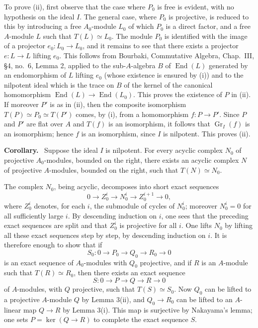 \documentclass[11pt]{article}
\newenvironment{statement}[1]{\par\medskip\noindent\textbf{#1.}\ }{\par\medskip}
\providecommand{\End}{\operatorname{End}}
\providecommand{\End}{\operatorname{End}}
\begin{document}
To prove (ii), first observe that the case where $P_0$ is free is evident, with no hypothesis on the ideal $I$. The general case, where $P_0$ is projective, is reduced to this by introducing a free $A_0$-module $L_0$ of which $P_0$ is a direct factor, and a free $A$-module $L$ such that $T(L)\simeq L_0$. The module $P_0$ is identified with the image of a projector $e_0:L_0\to L_0$, and it remains to see that there exists a projector $e:L\to L$ lifting $e_0$. This follows from Bourbaki, Commutative Algebra, Chap.~III, §4, no.~6, Lemma 2, applied to the sub-$A$-algebra $B$ of $\End(L)$ generated by an endomorphism of $L$ lifting $e_0$ (whose existence is ensured by (i)) and to the nilpotent ideal which is the trace on $B$ of the kernel of the canonical homomorphism $\End(L)\to\End(L_0)$. This proves the existence of $P$ in (ii). If moreover $P'$ is as in (ii), then the composite isomorphism $T(P)\simeq P_0\simeq T(P')$ comes, by (i), from a homomorphism $f:P\to P'$. Since $P$ and $P'$ are flat over $A$ and $T(f)$ is an isomorphism, it follows that $\operatorname{Gr}_I(f)$ is an isomorphism; hence $f$ is an isomorphism, since $I$ is nilpotent. This proves (ii).

\begin{statement}{Corollary}
Suppose the ideal $I$ is nilpotent. For every acyclic complex $N_0$ of projective $A_0$-modules, bounded on the right, there exists an acyclic complex $N$ of projective $A$-modules, bounded on the right, such that $T(N)\simeq N_0$.
\end{statement}

The complex $N_0$, being acyclic, decomposes into short exact sequences
\[
0\longrightarrow Z_0^i\longrightarrow N_0^i\longrightarrow Z_0^{i+1}\longrightarrow0,
\]
where $Z_0^i$ denotes, for each $i$, the submodule of cycles of $N_0^i$; moreover $N_0^i=0$ for all sufficiently large $i$. By descending induction on $i$, one sees that the preceding exact sequences are split and that $Z_0^i$ is projective for all $i$. One lifts $N_0$ by lifting all these exact sequences step by step, by descending induction on $i$. It is therefore enough to show that if
\[
S_0:0\longrightarrow P_0\longrightarrow Q_0\longrightarrow R_0\longrightarrow0
\]
is an exact sequence of $A_0$-modules with $Q_0$ projective, and if $R$ is an $A$-module such that $T(R)\simeq R_0$, then there exists an exact sequence
\[
S:0\longrightarrow P\longrightarrow Q\longrightarrow R\longrightarrow0
\]
of $A$-modules, with $Q$ projective, such that $T(S)\simeq S_0$. Now $Q_0$ can be lifted to a projective $A$-module $Q$ by Lemma 3(ii), and $Q_0\to R_0$ can be lifted to an $A$-linear map $Q\to R$ by Lemma 3(i). This map is surjective by Nakayama's lemma; one sets $P=\ker(Q\to R)$ to complete the exact sequence $S$.
\end{document}
